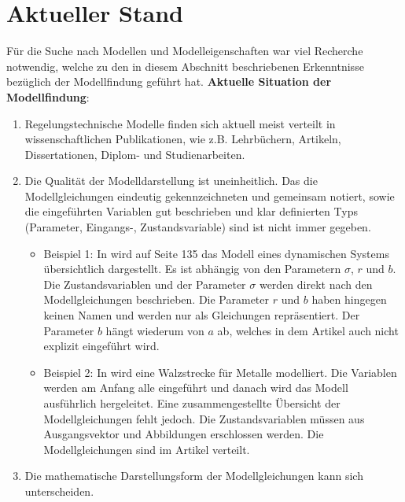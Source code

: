 \section{Aktueller Stand}
\label{Ch:Vorbetrachtung:Sec:CurrentState}
Für die Suche nach Modellen und Modelleigenschaften war viel Recherche notwendig, welche zu den in diesem Abschnitt beschriebenen Erkenntnisse bezüglich der Modellfindung geführt hat.
\textbf{Aktuelle Situation der Modellfindung}: 
\begin{enumerate}
	\item Regelungstechnische Modelle finden sich aktuell meist verteilt in wissenschaftlichen Publikationen, wie z.B. Lehrbüchern, Artikeln, Dissertationen, Diplom- und Studienarbeiten.
	\item Die Qualität der Modelldarstellung ist uneinheitlich. Das die Modellgleichungen eindeutig gekennzeichneten und gemeinsam notiert, sowie die eingeführten Variablen gut beschrieben und klar definierten Typs (Parameter, Eingangs-, Zustandsvariable) sind ist nicht immer gegeben.
	\begin{itemize}[label=$\bullet$]
		\item Beispiel 1: In \cite{LOR63} wird auf Seite 135 das Modell eines dynamischen Systems übersichtlich dargestellt. Es ist abhängig von den Parametern $\sigma$, $r$ und $b$. Die Zustandsvariablen und der Parameter $\sigma$ werden direkt nach den Modellgleichungen beschrieben. Die Parameter $r$ und $b$ haben hingegen keinen Namen und werden nur als Gleichungen repräsentiert. Der Parameter $b$ hängt wiederum von $a$ ab, welches in dem Artikel auch nicht explizit eingeführt wird.
		\item Beispiel 2: In \cite{YIFREA09} wird eine Walzstrecke für Metalle modelliert. Die Variablen werden am Anfang alle eingeführt und danach wird das Modell ausführlich hergeleitet. Eine zusammengestellte Übersicht der Modellgleichungen fehlt jedoch. Die Zustandsvariablen müssen aus Ausgangsvektor und Abbildungen erschlossen werden. Die Modellgleichungen sind im Artikel verteilt.
	\end{itemize}
	\item Die mathematische Darstellungsform der Modellgleichungen kann sich unterscheiden.
	\begin{itemize}[label=$\bullet$]

\end{itemize}
\end{enumerate}
